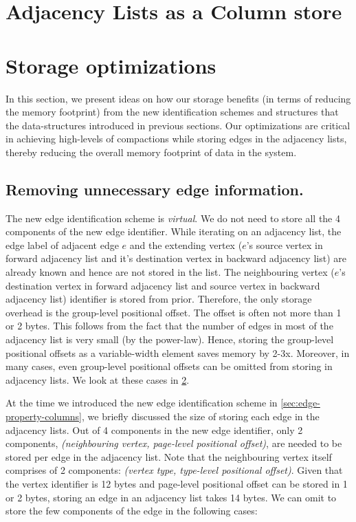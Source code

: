 \section{Adjacency Lists as a Column store}
\label{sec:adjacency-lists}


\section{Storage optimizations}
\label{sec:storage-optimizations}

In this section, we present ideas on how our storage benefits (in terms of reducing the memory footprint) from the new identification schemes and structures that the data-structures introduced in previous sections. Our optimizations are critical in achieving high-levels of compactions while storing edges in the adjacency lists, thereby reducing the overall memory footprint of data in the system.

\subsection{Removing unnecessary edge information.}

The new edge identification scheme is \emph{virtual}. We do not need to store all the 4 components of the new edge identifier. While iterating on an adjacency list, the edge label of adjacent edge $e$ and the extending vertex ($e$'s source vertex in forward adjacency list and it's destination vertex in backward adjacency list) are already known and hence are not stored in the list. The neighbouring vertex ($e$'s destination vertex in forward adjacency list and source vertex in backward adjacency list) identifier is stored from prior. Therefore, the only storage overhead is the group-level positional offset. The offset is often not more than 1 or 2 bytes. This follows from the fact that the number of edges in most of the adjacency list is very small (by the power-law). Hence, storing the group-level positional offsets as a variable-width element saves memory by 2-3x. Moreover, in many cases, even group-level positional offsets can be omitted from storing in adjacency lists. We look at these cases in \ref{sec:storage-optimizations}.

At the time we introduced the new edge identification scheme in \ref{sec:edge-property-columns}, we briefly discussed the size of storing each edge in the adjacency lists. Out of 4 components in the new edge identifier, only 2 components, \emph{(neighbouring vertex, page-level positional offset)}, are needed to be stored per edge in the adjacency list. Note that the neighbouring vertex itself comprises of 2 components: \emph{(vertex type, type-level positional offset)}. Given that the vertex identifier is 12 bytes and page-level positional offset can be stored in 1 or 2 bytes, storing an edge in an adjacency list takes 14 bytes. We can omit to store the few components of the edge in the following cases: 

